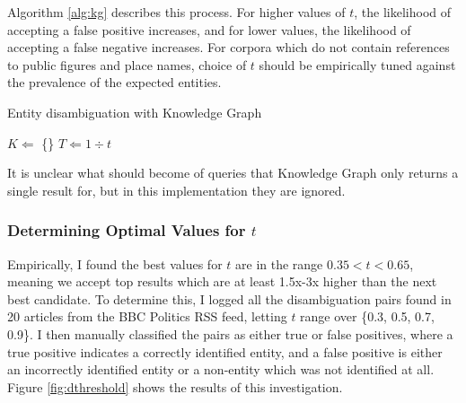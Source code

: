 Algorithm \ref{alg:kg} describes this process. For higher values of $t$, the likelihood of accepting a false positive increases, and for lower values, the likelihood of accepting a false negative increases. For corpora which do not contain references to public figures and place names, choice of $t$ should be empirically tuned against the prevalence of the expected entities.

\begin{algorithm}
\label{alg:kg}
 \caption{Entity disambiguation with Knowledge Graph}
 $K \Leftarrow$ \{\}\;
 $T \Leftarrow 1\div{t}$\;
\end{algorithm}

It is unclear what should become of queries that Knowledge Graph only returns a single result for, but in this implementation they are ignored.

\subsubsection{Determining Optimal Values for $t$}

Empirically, I found the best values for $t$ are in the range $0.35 < t < 0.65$, meaning we accept top results which are at least 1.5x-3x higher than the next best candidate. To determine this, I logged all the disambiguation pairs found in 20 articles from the BBC Politics RSS feed, letting $t$ range over \{0.3, 0.5, 0.7, 0.9\}. I then manually classified the pairs as either true or false positives, where a true positive indicates a correctly identified entity, and a false positive is either an incorrectly identified entity or a non-entity which was not identified at all. Figure \ref{fig:dthreshold} shows the results of this investigation.

